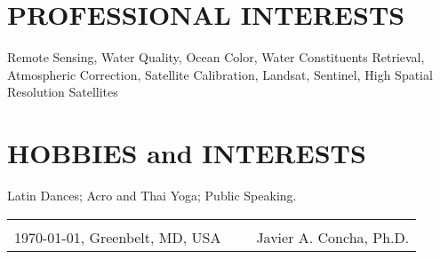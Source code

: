 \documentclass[11pt]{res} %
\begin{document}
\begin{resume}
\vspace{-0.1in}
\section{PROFESSIONAL INTERESTS}
\vspace{0.1in}
Remote Sensing, Water Quality, Ocean Color, Water Constituents Retrieval, Atmospheric Correction, Satellite Calibration, Landsat, Sentinel, High Spatial Resolution Satellites\\

\vspace{-0.1in}
\section{HOBBIES and INTERESTS}
\vspace{0.1in}
Latin Dances; Acro and Thai Yoga; Public Speaking. \\


\vspace{4cm}
\begin{tabular}{@{}p{4.3in}p{2in}@{}}
& \hrulefill \\
\today, Greenbelt, MD, USA \hfill& ~~~Javier A. Concha, Ph.D.\\
\end{tabular}
\end{resume}
\end{document}
